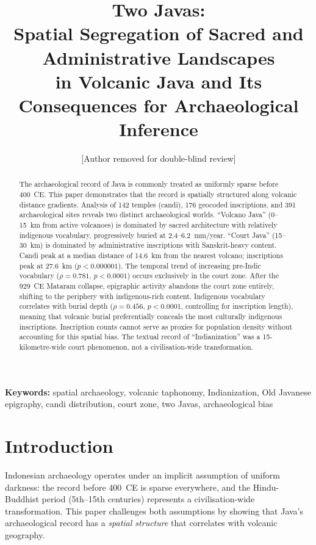 \documentclass[12pt]{article}
\title{Two Javas:\\Spatial Segregation of Sacred and Administrative Landscapes\\in Volcanic Java and Its Consequences for Archaeological Inference}
\author{[Author removed for double-blind review]}
\date{}
\begin{document}
\maketitle

\begin{abstract}
The archaeological record of Java is commonly treated as uniformly sparse before 400~CE.
This paper demonstrates that the record is spatially structured along volcanic distance gradients.
Analysis of 142 temples (candi), 176 geocoded inscriptions, and 391 archaeological sites reveals two distinct archaeological worlds.
``Volcano Java'' (0--15~km from active volcanoes) is dominated by sacred architecture with relatively indigenous vocabulary, progressively buried at 2.4--6.2~mm/year.
``Court Java'' (15--30~km) is dominated by administrative inscriptions with Sanskrit-heavy content.
Candi peak at a median distance of 14.6~km from the nearest volcano; inscriptions peak at 27.6~km ($p < 0.000001$).
The temporal trend of increasing pre-Indic vocabulary ($\rho = 0.781$, $p < 0.0001$) occurs exclusively in the court zone.
After the 929~CE Mataram collapse, epigraphic activity abandons the court zone entirely, shifting to the periphery with indigenous-rich content.
Indigenous vocabulary correlates with burial depth ($\rho = 0.456$, $p < 0.0001$, controlling for inscription length), meaning that volcanic burial preferentially conceals the most culturally indigenous inscriptions.
Inscription counts cannot serve as proxies for population density without accounting for this spatial bias.
The textual record of ``Indianization'' was a 15-kilometre-wide court phenomenon, not a civilisation-wide transformation.
\end{abstract}

\noindent\textbf{Keywords:} spatial archaeology, volcanic taphonomy, Indianization, Old Javanese epigraphy, candi distribution, court zone, two Javas, archaeological bias


\section{Introduction}

Indonesian archaeology operates under an implicit assumption of uniform darkness: the record before 400~CE is sparse everywhere, and the Hindu-Buddhist period (5th--15th centuries) represents a civilisation-wide transformation.
This paper challenges both assumptions by showing that Java's archaeological record has a \emph{spatial structure} that correlates with volcanic geography.
\end{document}
